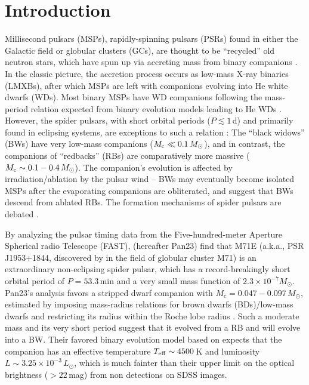 \documentclass[twocolumn]{aastex631}
\begin{document}
\section{Introduction} \label{sec:intro}
Millisecond pulsars (MSPs), rapidly-spinning pulsars (PSRs) found in either the Galactic field or globular clusters (GCs), are thought to be ``recycled'' old neutron stars, which have spun up via accreting mass from binary companions \citep{Alpar1982, BH1991}. In the classic picture, the accretion process occurs as low-mass X-ray binaries (LMXBs), after which MSPs are left with companions evolving into He white dwarfs (WDs). Most binary MSPs have WD companions following the mass-period relation expected from binary evolution models leading to He WDs \citep{HeWD1999}. However, the spider pulsars, with short orbital periods ($P\lesssim1$\,d) and primarily found in eclipsing systems, are exceptions to such a relation \citep[see, e.g.,][]{Roberts2013}: The ``black widows'' (BWs) have very low-mass companions ($M_{\rm c}\ll0.1\,M_\odot$), and in contrast, the companions of ``redbacks'' (RBs) are comparatively more massive ($M_{\rm c}\sim 0.1-0.4\,M_\odot$). The companion's evolution is affected by irradiation/ablation by the pulsar wind -- BWs may eventually become isolated MSPs after the evaporating companions are obliterated, and  \citet{Benvenuto2014} suggest that BWs descend from ablated RBs. The formation mechanisms of spider pulsars are debated \citep[e.g.,][]{King2003, King2005, Chen2013, Benvenuto2014, Jia2015, Ginzburg2020}. 

By analyzing the pulsar timing data from the Five-hundred-meter Aperture Spherical radio Telescope (FAST), \citet{pan_binary_2023} (hereafter Pan23) find that M71E (a.k.a., PSR J1953+1844, discovered by \citealt{Han2021} in the field of globular cluster M71) is an extraordinary non-eclipsing spider pulsar, which has a record-breakingly short orbital period of $P=53.3$\,min and a very small mass function of $2.3\times10^{-7}M_\odot$. Pan23's analysis favors a stripped dwarf companion with $M_c = 0.047 - 0.097\,M_\odot$, estimated by imposing mass-radius relations for brown dwarfs (BDs)/low-mass dwarfs \citep{Burrows1993} and restricting its radius within the Roche lobe radius \citep{Eggleton1983}. Such a moderate mass and its very short period suggest that it evolved from a RB and will evolve into a BW. Their favored binary evolution model based on \citet{Chen2013} expects that the companion has an effective temperature $T_{\rm eff}\sim4500$\,K and luminosity $L\sim3.25\times10^{-3}\,L_\odot$, which is much fainter than their upper limit on the optical brightness ($>22$\,mag) from non detections on SDSS images. 
\end{document}
